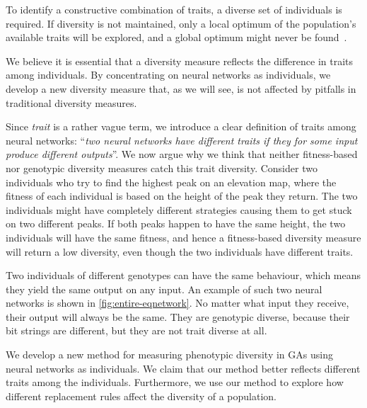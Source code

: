 To identify a constructive combination of traits, a diverse set of individuals is required. If diversity is not maintained, only a local optimum of the population's available traits will be explored, and a global optimum might never be found~\cite{ursem2002diversity}.

We believe it is essential that a diversity measure reflects the difference in traits among individuals. By concentrating on neural networks as individuals, we develop a new diversity measure that, as we will see, is not affected by pitfalls in traditional diversity measures.

Since \emph{trait} is a rather vague term, we introduce a clear definition of traits among neural networks: ``\emph{two neural networks have different traits if they for some input produce different outputs}''. We now argue why we think that neither fitness-based nor genotypic diversity measures catch this trait diversity.
Consider two individuals who try to find the highest peak on an elevation map, where the fitness of each individual is based on the height of the peak they return. The two individuals might have completely different strategies causing them to get stuck on two different peaks. If both peaks happen to have the same height, the two individuals will have the same fitness, and hence a fitness-based diversity measure will return a low diversity, even though the two individuals have different traits.

Two individuals of different genotypes can have the same behaviour, which means they yield the same output on any input. An example of such two neural networks is shown in \cref{fig:entire-eqnetwork}. No matter what input they receive, their output will always be the same. They are genotypic diverse, because their bit strings are different, but they are not trait diverse at all.
%

%
We develop a new method for measuring phenotypic diversity in GAs using neural networks as individuals. We claim that our method better reflects different traits among the individuals. Furthermore, we use our method to explore how different replacement rules affect the diversity of a population.

